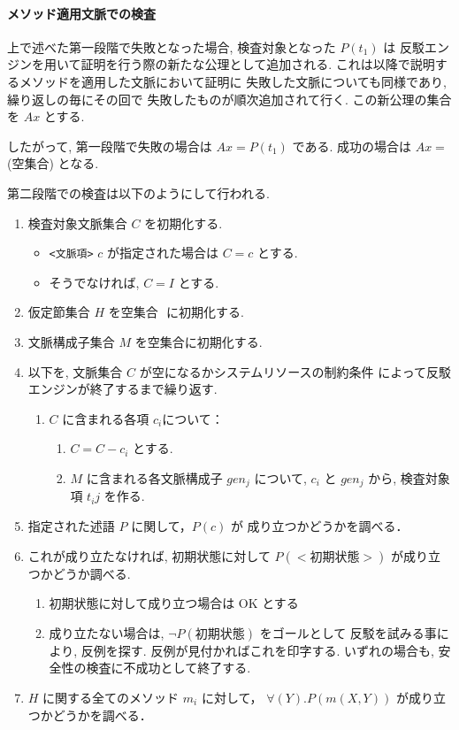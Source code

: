 \paragraph{メソッド適用文脈での検査}
上で述べた第一段階で失敗となった場合,
検査対象となった $P(t_1)$ は
反駁エンジンを用いて証明を行う際の新たな公理として追加される.
これは以降で説明するメソッドを適用した文脈において証明に
失敗した文脈についても同様であり, 繰り返しの毎にその回で
失敗したものが順次追加されて行く.
この新公理の集合を $Ax$ とする.

\noindent
したがって, 第一段階で失敗の場合は
$Ax={P(t_1)}$ である. 成功の場合は $Ax={}$(空集合) となる.

\noindent
第二段階での検査は以下のようにして行われる.
\begin{enumerate}
\item 検査対象文脈集合 $C$ を初期化する.
  \begin{itemize}
  \item \texttt{<文脈項>} $c$ が指定された場合は $C={c}$ とする.
  \item そうでなければ, $C={I}$ とする.
  \end{itemize}
\item 仮定節集合 $H$ を空集合 ${}$ に初期化する.
\item 文脈構成子集合 $M$ を空集合に初期化する.
\item 以下を, 文脈集合 $C$ が空になるかシステムリソースの制約条件
  によって反駁エンジンが終了するまで繰り返す.
  \begin{enumerate}
  \item $C$ に含まれる各項 $c_i$について：
    \begin{enumerate}
    \item $C=C - {c_i}$ とする.
    \item $M$ に含まれる各文脈構成子 $gen_j$ について,
      $c_i$ と $gen_j$ から, 検査対象項 $t_ij$ を作る.
    \end{enumerate}
  \end{enumerate}
\item 指定された述語 $P$ に関して，$P(c)$ が
      成り立つかどうかを調べる．
\item これが成り立たなければ, 初期状態に対して $P(<初期状態>)$ 
  が成り立つかどうか調べる.
  \begin{enumerate}
  \item 初期状態に対して成り立つ場合は OK とする
  \item 成り立たない場合は, $\neg P(初期状態)$ をゴールとして
    反駁を試みる事により, 反例を探す.
    反例が見付かればこれを印字する.
    いずれの場合も, 安全性の検査に不成功として終了する.
  \end{enumerate}
\item $H$ に関する全てのメソッド $m_i$ に対して，
      $\forall(Y) . P(m(X, Y))$ が成り立つかどうかを調べる．
\end{enumerate}

